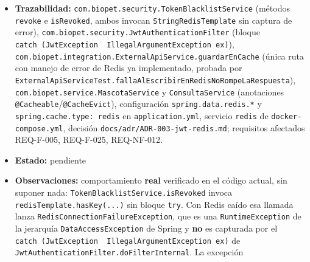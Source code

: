 \documentclass[
  spanish,
]{article}
\begin{document}
\begin{itemize}
\item
  \textbf{Trazabilidad:}
  \texttt{com.\allowbreak{}biopet.\allowbreak{}security.\allowbreak{}Token\allowbreak{}Blacklist\allowbreak{}Service} (métodos
  \texttt{revoke} e \texttt{is\allowbreak{}Revoked}, ambos invocan
  \texttt{String\allowbreak{}Redis\allowbreak{}Template} sin captura de error),
  \texttt{com.\allowbreak{}biopet.\allowbreak{}security.\allowbreak{}Jwt\allowbreak{}Authentication\allowbreak{}Filter} (bloque
  \texttt{catch\ (Jwt\allowbreak{}Exception\ \textbar{}\ Illeg\allowbreak{}al\allowbreak{}Argument\allowbreak{}Exception\ ex)}),
  \texttt{com.\allowbreak{}biopet.\allowbreak{}integration.\allowbreak{}External\allowbreak{}Api\allowbreak{}Service.\allowbreak{}guardar\allowbreak{}En\allowbreak{}Cache}
  (única ruta con manejo de error de Redis ya implementado, probada por
  \texttt{External\allowbreak{}Api\allowbreak{}Service\allowbreak{}Test.\allowbreak{}falla\allowbreak{}Al\allowbreak{}Escribir\allowbreak{}En\allowbreak{}Redis\allowbreak{}No\allowbreak{}Rompe\allowbreak{}La\allowbreak{}Respuesta}),
  \texttt{com.\allowbreak{}biopet.\allowbreak{}service.\allowbreak{}Mascota\allowbreak{}Service} y \texttt{Consulta\allowbreak{}Service}
  (anotaciones \texttt{@Cacheable}/\texttt{@Cache\allowbreak{}Evict}), configuración
  \texttt{spring.\allowbreak{}data.\allowbreak{}redis.*} y \texttt{spring.\allowbreak{}cache.\allowbreak{}type:\ redis} en
  \texttt{application.\allowbreak{}yml}, servicio \texttt{redis} de
  \texttt{docker-\allowbreak{}compose.\allowbreak{}yml}, decisión
  \texttt{docs/\allowbreak{}adr/\allowbreak{}ADR-\allowbreak{}003-\allowbreak{}jwt-\allowbreak{}redis.\allowbreak{}md}; requisitos afectados
  REQ-F-005, REQ-F-025, REQ-NF-012.
\item
  \textbf{Estado:} pendiente
\item
  \textbf{Observaciones:} comportamiento \textbf{real} verificado en el
  código actual, sin suponer nada:
  \texttt{Token\allowbreak{}Blacklist\allowbreak{}Service.\allowbreak{}is\allowbreak{}Revoked} invoca
  \texttt{redis\allowbreak{}Template.\allowbreak{}has\allowbreak{}Key(...)} sin bloque \texttt{try}. Con Redis
  caído esa llamada lanza \texttt{Redis\allowbreak{}Connection\allowbreak{}Failure\allowbreak{}Exception}, que
  es una \texttt{Runtime\allowbreak{}Exception} de la jerarquía
  \texttt{Data\allowbreak{}Access\allowbreak{}Exception} de Spring y \textbf{no} es capturada por
  el
  \texttt{catch\ (Jwt\allowbreak{}Exception\ \textbar{}\ Illeg\allowbreak{}al\allowbreak{}Argument\allowbreak{}Exception\ ex)}
  de \texttt{Jwt\allowbreak{}Authentication\allowbreak{}Filter.\allowbreak{}do\allowbreak{}Filter\allowbreak{}Internal}. La excepción

\end{itemize}
\end{document}
